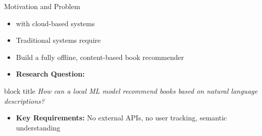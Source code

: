 \begin{frame}{Motivation and Problem}
\begin{itemize}
  \item {} with cloud-based systems
  \item Traditional systems require 
  \item {} Build a fully offline, content-based book recommender
  \vspace{0.1cm}
  \item \textbf{Research Question:}
\end{itemize}

\begin{center}
\begin{beamercolorbox}[sep=5pt,center,rounded=true]{block title}
\footnotesize \textit{How can a local ML model recommend books based on natural language descriptions?}
\end{beamercolorbox}
\end{center}

\vspace{0.2cm}
\begin{itemize}
  \item \textbf{Key Requirements:} No external APIs, no user tracking, semantic understanding
\end{itemize}
\end{frame}